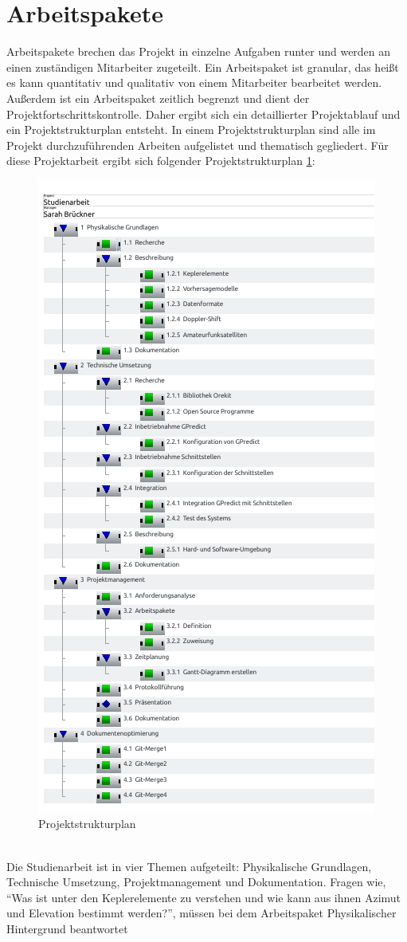 \section{Arbeitspakete}
Arbeitspakete brechen das Projekt in einzelne Aufgaben runter und werden an einen 
zuständigen Mitarbeiter zugeteilt. Ein Arbeitspaket ist granular, das heißt es kann quantitativ und 
qualitativ von einem Mitarbeiter bearbeitet werden. Außerdem ist ein Arbeitspaket zeitlich begrenzt 
und dient der Projektfortschrittskontrolle. 
Daher ergibt sich ein detaillierter Projektablauf und ein Projektstrukturplan entsteht. In einem 
Projektstrukturplan sind alle im Projekt durchzuführenden Arbeiten aufgelistet und thematisch 
gegliedert. Für diese Projektarbeit ergibt sich folgender Projektstrukturplan 
\ref{fig:projektstruktur}:\\
\begin{figure}[h]
 \centering
\includegraphics[width=0.5\linewidth]{./images/00tasks}
\caption{Projektstrukturplan}
 \label{fig:projektstruktur}
\end{figure}
\\
Die Studienarbeit ist in vier Themen aufgeteilt: Physikalische Grundlagen, Technische Umsetzung, 
Projektmanagement und Dokumentation. Fragen wie, ``Was ist unter den Keplerelemente zu 
verstehen und wie kann aus ihnen Azimut und Elevation bestimmt werden?'', müssen bei dem Arbeitspaket Physikalischer Hintergrund  beantwortet 
